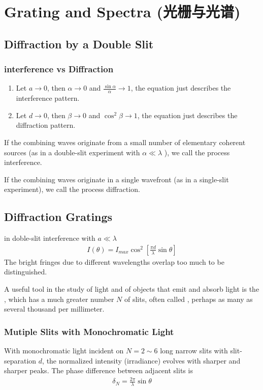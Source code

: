 \newpage
\section[Grating and Spectra]{Grating and Spectra (光栅与光谱)}

\subsection{Diffraction by a Double Slit}

\subsubsection{interference vs Diffraction}
\begin{enumerate}
    \item Let $a\rightarrow 0$, then $\alpha \rightarrow 0$ and $\frac{\sin\alpha}{\alpha}\rightarrow 1$, the equation just describes the interference pattern. 
    \item Let $d\rightarrow 0$, then $\beta \rightarrow 0$ and $\cos^2\beta\rightarrow 1$, the equation just describes the diffraction pattern. 
\end{enumerate}

If the combining waves originate from a small number of elementary coherent sources (as in a double-slit experiment with $\alpha \ll \lambda$ ), we call the process interference. 

If the combining waves originate in a single wavefront (as in a single-slit experiment), we call the process diffraction.  

\subsection{Diffraction Gratings}
in doble-slit interference with $a\ll \lambda$
\begin{align*}
    I(\theta)=I_{max}\cos^2\left[ \frac{\pi d}{\lambda}\sin \theta \right]
\end{align*}
The bright fringes due to different wavelengths overlap too much to be distinguished. 

A useful tool in the study of light and of objects that emit and absorb light is the , which has a much greater number $N$ of slits, often called , perhaps as many as several thousand per millimeter.

\subsubsection{Mutiple Slits with Monochromatic Light}
With monochromatic light incident on $N=2 \sim 6$ long narrow slits with slit-separation $d$, the normalized intensity (irradiance) evolves with sharper and sharper peaks. The phase difference between adjacent slits is 
\begin{align*}
    \delta_N =\frac{2\pi}{\lambda}\sin\theta
\end{align*}

